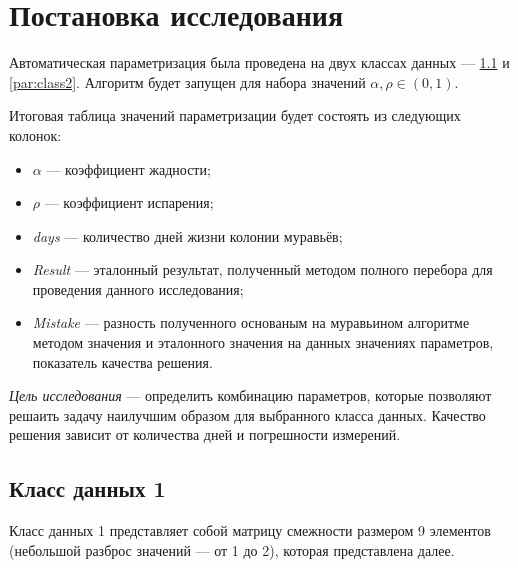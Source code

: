 	

\clearpage


\section{Постановка исследования}

Автоматическая параметризация была проведена на двух классах данных --- \ref{par:class1} и \ref{par:class2}. Алгоритм будет запущен для набора значений $\alpha, \rho \in (0, 1)$.

Итоговая таблица значений параметризации будет состоять из следующих колонок:
\begin{itemize}[label=---]
	\item $\alpha$ --- коэффициент жадности;
	\item $\rho$ --- коэффициент испарения;
	\item \textit{days} --- количество дней жизни колонии муравьёв;
	\item \textit{Result} --- эталонный результат, полученный методом полного перебора для проведения данного исследования;
	\item \textit{Mistake} --- разность полученного основаным на муравьином алгоритме методом значения и эталонного значения на данных значениях параметров, показатель качества решения.
\end{itemize}

\textit{Цель исследования} --- определить комбинацию параметров, которые позволяют решаить задачу наилучшим образом для выбранного класса данных. Качество решения зависит от количества дней и погрешности измерений.


\subsection{Класс данных 1}
\label{par:class1}

Класс данных 1 представляет собой матрицу смежности размером 9 элементов (небольшой разброс значений --- от 1 до 2), которая представлена далее.

